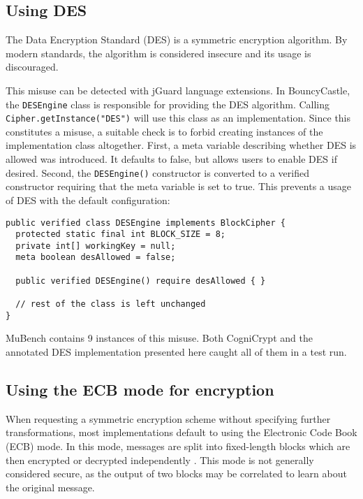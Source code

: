 \documentclass{article}
\begin{document}
\subsection{Using DES}

The Data Encryption Standard (DES) is a symmetric encryption algorithm.
By modern standards, the algorithm is considered insecure and its usage is discouraged.

This misuse can be detected with jGuard language extensions. In BouncyCastle, the \texttt{DESEngine} class
is responsible for providing the DES algorithm.
Calling \texttt{Cipher.\allowbreak getInstance("DES")} will use this class as an implementation.
Since this constitutes a misuse, a suitable check is to forbid creating instances of the implementation class
altogether.
First, a meta variable describing whether DES is allowed was introduced. It defaults to false, but allows users to enable DES if desired.
Second, the \texttt{DESEngine()} constructor is converted to a verified constructor requiring that the
meta variable is set to true. This prevents a usage of DES with the default configuration:

\begin{lstlisting}[style=jGuard]
public verified class DESEngine implements BlockCipher {
  protected static final int BLOCK_SIZE = 8; 
  private int[] workingKey = null; 
  meta boolean desAllowed = false; 

  public verified DESEngine() require desAllowed { }

  // rest of the class is left unchanged
}
\end{lstlisting}

MuBench contains \num{9} instances of this misuse.
Both CogniCrypt and the annotated DES implementation presented here caught all of them
in a test run.

\subsection{Using the ECB mode for encryption}\label{sec:MuBench:ECB}

When requesting a symmetric encryption scheme without specifying further transformations,
most implementations default to using the Electronic Code Book (ECB) mode.
In this mode, messages are split into fixed-length blocks which are then encrypted or
decrypted independently .
This mode is not generally considered secure, as the output of two blocks may
be correlated to learn about the original message.
\end{document}
